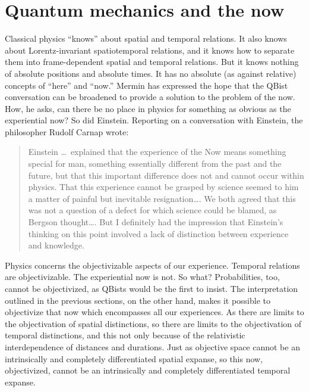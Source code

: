 \documentclass[smallextended]{svjour3}
\newcommand{\bq}{\begin{quote}}
\newcommand{\eq}{\end{quote}}
\begin{document}
\section{Quantum mechanics and the now}\label{sec_now}
Classical physics ``knows'' about spatial and temporal relations. It also knows about Lorentz-invariant spatiotemporal relations, and it knows how to separate them into frame-dependent spatial and temporal relations. But it knows nothing of absolute positions and absolute times. It has no absolute (as against relative) concepts of ``here'' and ``now.'' Mermin\cite{Mermin_Nature} has expressed the hope that the QBist conversation can be broadened to provide a solution to the problem of the now. How, he asks, can there be no place in physics for something as obvious as the experiential now? So did Einstein. Reporting on a conversation with Einstein, the philosopher Rudolf Carnap\cite{Carnap} wrote:
\bq
 Einstein \dots\ explained that the experience of the Now means something special for man, something essentially different from the past and the future, but that this important difference does not and cannot occur within physics. That this experience cannot be grasped by science seemed to him a matter of painful but inevitable resignation\dots. We both agreed that this was not a question of a defect for which science could be blamed, as Bergson thought\dots. But I definitely had the impression that Einstein's thinking on this point involved a lack of distinction between experience and knowledge.
\eq
Physics concerns the {objectivizable} aspects of our experience. Temporal relations are objectivizable. The experiential now is not. So what? Probabilities, too, cannot be objectivized, as QBists would be the first to insist. The interpretation outlined in the previous sections, on the other hand, makes it possible to objectivize that now which encompasses all our experiences. As there are limits to the objectivation of spatial distinctions, so there are limits to the objectivation of temporal distinctions, and this not only because of the relativistic interdependence of distances and durations.\cite{Mohrhoff_Manifesting} Just as objective space cannot be an intrinsically and completely differentiated spatial expanse, so this now, objectivized, cannot be an intrinsically and completely differentiated temporal expanse.
\end{document}
